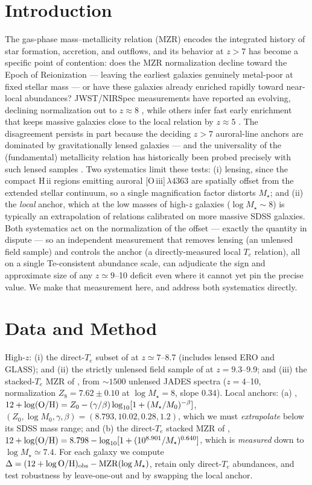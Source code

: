 \documentclass[twocolumn]{aastex631}
\begin{document}
\section{Introduction}
The gas-phase mass--metallicity relation (MZR) encodes the integrated history of star formation, accretion,
and outflows, and its behavior at $z>7$ has become a specific point of contention: does the MZR
normalization decline toward the Epoch of Reionization --- leaving the earliest galaxies genuinely
metal-poor at fixed stellar mass --- or have these galaxies already enriched rapidly toward near-local
abundances? JWST/NIRSpec measurements have reported an evolving, declining normalization out to $z\approx8$
\citep{langeroodi23,sarkar25}, while others infer fast early enrichment that keeps massive galaxies close to
the local relation by $z\approx5$ \citep{faisst26}. The disagreement persists in part because the deciding
$z>7$ auroral-line anchors are dominated by gravitationally lensed galaxies --- and the universality of the
(fundamental) metallicity relation has historically been probed precisely with such lensed samples
\citep{belli13}. Two systematics limit these tests: (i) lensing, since the compact H\,{\sc ii} regions
emitting auroral [O\,{\sc iii}]\,$\lambda4363$ are spatially offset from the extended stellar continuum, so
a single magnification factor distorts $M_\star$; and (ii) the \emph{local} anchor, which at the low masses
of high-$z$ galaxies ($\log M_\star\sim8$) is typically an extrapolation of relations calibrated on more
massive SDSS galaxies. Both systematics act on the normalization of the offset --- exactly the quantity in
dispute --- so an independent measurement that removes lensing (an unlensed field sample) and controls the
anchor (a directly-measured local $T_e$ relation), all on a single Te-consistent abundance scale, can
adjudicate the sign and approximate size of any $z\simeq9$--10 deficit even where it cannot yet pin the
precise value. We make that measurement here, and address both systematics directly.

\section{Data and Method}
High-$z$: (i) the direct-$T_e$ subset of \citet{nakajima23} at $z\simeq7$--8.7 (includes lensed ERO and
GLASS); and (ii) the strictly unlensed field sample of \citet{pollock26} at $z=9.3$--9.9; and (iii) the stacked-$T_e$ MZR
of \citet{isobe26}, from $\sim1500$ unlensed JADES spectra ($z=4$--10, normalization $Z_8=7.62\pm0.10$ at
$\log M_\star=8$, slope $0.34$). Local anchors:
(a) \citet{curti20}, $12+\log({\rm O/H})=Z_0-(\gamma/\beta)\log_{10}[1+(M_\star/M_0)^{-\beta}]$,
$(Z_0,\log M_0,\gamma,\beta)=(8.793,10.02,0.28,1.2)$, which we must \emph{extrapolate} below its SDSS mass
range; and (b) the direct-$T_e$ stacked MZR of \citet{am13},
$12+\log({\rm O/H})=8.798-\log_{10}[1+(10^{8.901}/M_\star)^{0.640}]$, which is \emph{measured} down to
$\log M_\star\simeq7.4$. For each galaxy we compute $\Delta=(12+\log{\rm O/H})_{\rm obs}-{\rm MZR}(\log M_\star)$,
retain only direct-$T_e$ abundances, and test robustness by leave-one-out and by swapping the local anchor.
\end{document}
